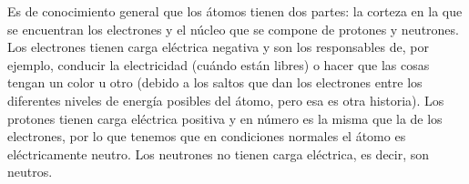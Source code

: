Es de conocimiento general que los átomos tienen dos partes: la corteza en la que se encuentran los electrones y el núcleo que se compone de protones y neutrones. Los electrones tienen carga eléctrica negativa y son los responsables de, por ejemplo, conducir la electricidad (cuándo están libres) o hacer que las cosas tengan un color u otro (debido a los saltos que dan los electrones entre los diferentes niveles de energía posibles del átomo, pero esa es otra historia). Los protones tienen carga eléctrica positiva y en número es la misma que la de los electrones, por lo que tenemos que en condiciones normales el átomo es eléctricamente neutro. Los neutrones no tienen carga eléctrica, es decir, son neutros.